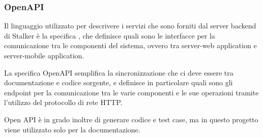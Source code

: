 \documentclass[../../../manuale-manutentore.tex]{subfiles}
\begin{document}
\subsubsection{OpenAPI}%
\label{subs:openapi}

Il linguaggio utilizzato per descrivere i servizi che sono forniti dal server backend di Stalker è la specifica , che definisce quali sono le interfacce per la comunicazione tra le componenti del sistema, ovvero tra server-web application e server-mobile application.

La specifica OpenAPI semplifica la sincronizzazione che ci deve essere tra documentazione e codice sorgente, e definisce in particolare quali sono gli endpoint per la comunicazione tra le varie componenti e le sue operazioni tramite l'utilizzo del protocollo di rete HTTP\@.

Open API è in grado inoltre di generare codice e test case, ma in questo progetto viene utilizzato solo per la documentazione.
\end{document}
